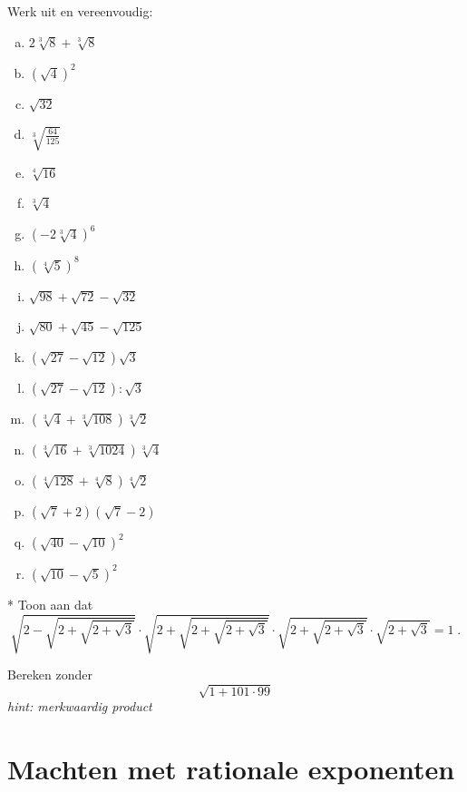 \documentclass[12pt,twoside]{article}
\begin{document}
\begin{oefening}
Werk uit en vereenvoudig:
\begin{multicols}{3}
\begin{enumerate}[(a)]
  \itemsep.5em
  \item $2\sqrt[3]{8}+\sqrt[3]{8}$
  \item $\left(\sqrt{4}\right)^2$
  \item $\sqrt{32}$
  \item $\sqrt[3]{\frac{64}{125}}$
  \item $\sqrt[4]{16}$
  \item $\sqrt[3]{4}$
  \item $\left(-2\sqrt[3]{4}\right)^6$
  \item $\left(\sqrt[4]{5}\right)^8$
  \item $\sqrt{98}+\sqrt{72}-\sqrt{32}$
  \item $\sqrt{80}+\sqrt{45}-\sqrt{125}$
  \item $\left(\sqrt{27}-\sqrt{12}\right)\sqrt{3}$
  \item $\left(\sqrt{27}-\sqrt{12}\right):\sqrt{3}$
  \item $\left(\sqrt[3]{4}+\sqrt[3]{108}\right)\sqrt[3]{2}$
  \item $\left(\sqrt[3]{16}+\sqrt[3]{1024}\right)\sqrt[3]{4}$
  \item $\left(\sqrt[4]{128}+\sqrt[4]{8}\right)\sqrt[4]{2}$
  \item $\left(\sqrt{7}+2\right)\left(\sqrt{7}-2\right)$
  \item $\left(\sqrt{40}-\sqrt{10}\right)^2$
  \item $\left(\sqrt{10}-\sqrt{5}\right)^2$
\end{enumerate}
\end{multicols}
\end{oefening}

\begin{oefening}*
Toon aan dat
$$\sqrt{2-\sqrt{2+\sqrt{2+\sqrt{3}}}}\cdot\sqrt{2+\sqrt{2+\sqrt{2+\sqrt{3}}}}\cdot\sqrt{2+\sqrt{2+\sqrt{3}}}\cdot\sqrt{2+\sqrt{3}} = 1\;.$$
\end{oefening}

\begin{oefening}
Bereken zonder 
$$\sqrt{1+101\cdot99}$$
{\em hint: merkwaardig product}
\end{oefening}

\pagebreak
\section{Machten met rationale exponenten}
\end{document}
